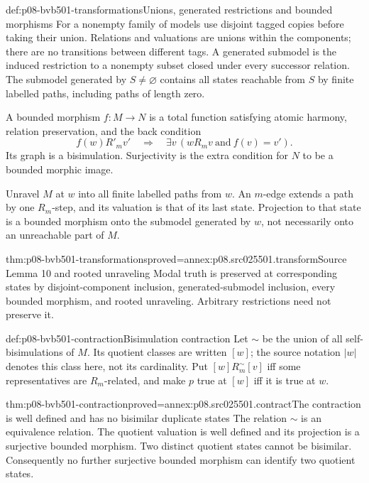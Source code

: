 \begin{hbdefinition}{def:p08-bvb501-transformations}{Unions, generated restrictions and bounded morphisms}
For a nonempty family of models use disjoint tagged copies before taking
their union. Relations and valuations are unions within the components;
there are no transitions between different tags. A generated submodel is
the induced restriction to a nonempty subset closed under every successor
relation. The submodel generated by \(S\ne\varnothing\) contains all
states reachable from \(S\) by finite labelled paths, including paths
of length zero.

A bounded morphism \(f:M\to N\) is a total function satisfying atomic
harmony, relation preservation, and the back condition
\[
 f(w)R'_mv'\quad\Longrightarrow\quad
 \exists v\,(wR_mv\ \text{and}\ f(v)=v').
\]
Its graph is a bisimulation. Surjectivity is the extra condition for
\(N\) to be a bounded morphic image.

Unravel \(M\) at \(w\) into all finite labelled paths from \(w\).
An \(m\)-edge extends a path by one \(R_m\)-step, and its valuation
is that of its last state. Projection to that state is a bounded morphism
onto the submodel generated by \(w\), not necessarily onto an unreachable
part of \(M\).
\end{hbdefinition}

\begin{hbtheorem}{thm:p08-bvb501-transformations}{proved=annex:p08.src025501.transform}{Source Lemma 10 and rooted unraveling}
Modal truth is preserved at corresponding states by disjoint-component
inclusion, generated-submodel inclusion, every bounded morphism, and
rooted unraveling. Arbitrary restrictions need not preserve it.
\end{hbtheorem}

\begin{hbdefinition}{def:p08-bvb501-contraction}{Bisimulation contraction}
Let \(\sim\) be the union of all self-bisimulations of \(M\).
Its quotient classes are written \([w]\); the source notation
\(\lvert w\rvert\) denotes this class here, not its cardinality.
Put \([w]R_m^{\sim}[v]\) iff some representatives are \(R_m\)-related,
and make \(p\) true at \([w]\) iff it is true at \(w\).
\end{hbdefinition}

\begin{hbtheorem}{thm:p08-bvb501-contraction}{proved=annex:p08.src025501.contract}{The contraction is well defined and has no bisimilar duplicate states}
The relation \(\sim\) is an equivalence relation. The quotient valuation
is well defined and its projection is a surjective bounded morphism.
Two distinct quotient states cannot be bisimilar. Consequently no further
surjective bounded morphism can identify two quotient states.
\end{hbtheorem}

